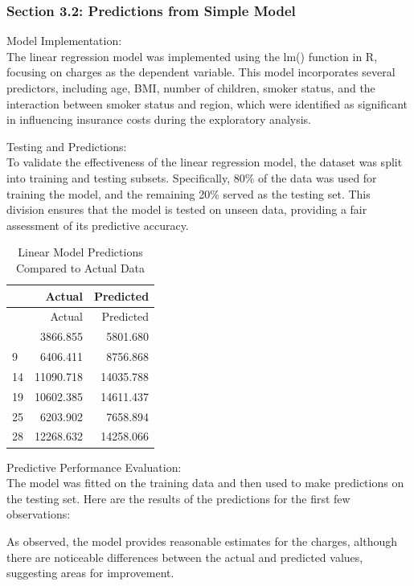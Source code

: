 \documentclass[
  12pt,
]{article}
\begin{document}
\subsubsection{Section 3.2: Predictions from Simple
Model}\label{section-3.2-predictions-from-simple-model}

Model Implementation:\\
The linear regression model was implemented using the lm() function in
R, focusing on charges as the dependent variable. This model
incorporates several predictors, including age, BMI, number of children,
smoker status, and the interaction between smoker status and region,
which were identified as significant in influencing insurance costs
during the exploratory analysis.

Testing and Predictions:\\
To validate the effectiveness of the linear regression model, the
dataset was split into training and testing subsets. Specifically, 80\%
of the data was used for training the model, and the remaining 20\%
served as the testing set. This division ensures that the model is
tested on unseen data, providing a fair assessment of its predictive
accuracy.

\begin{longtable}[]{@{}lrr@{}}
\caption{Linear Model Predictions Compared to Actual
Data}\tabularnewline
\toprule\noalign{}
& Actual & Predicted \\
\midrule\noalign{}
\endfirsthead
\toprule\noalign{}
& Actual & Predicted \\
\midrule\noalign{}
\endhead
\bottomrule\noalign{}
\endlastfoot
5 & 3866.855 & 5801.680 \\
9 & 6406.411 & 8756.868 \\
14 & 11090.718 & 14035.788 \\
19 & 10602.385 & 14611.437 \\
25 & 6203.902 & 7658.894 \\
28 & 12268.632 & 14258.066 \\
\end{longtable}

Predictive Performance Evaluation:\\
The model was fitted on the training data and then used to make
predictions on the testing set. Here are the results of the predictions
for the first few observations:

As observed, the model provides reasonable estimates for the charges,
although there are noticeable differences between the actual and
predicted values, suggesting areas for improvement.
\end{document}
